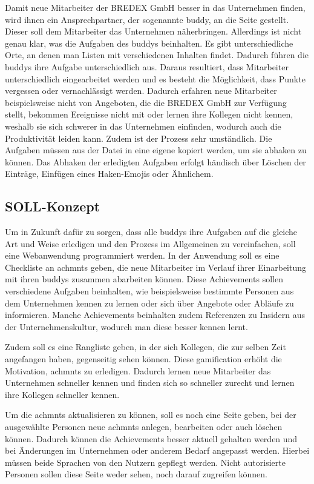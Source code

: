 \documentclass[11pt]{article}
\begin{document}
Damit neue Mitarbeiter der BREDEX GmbH besser in das Unternehmen
finden, wird ihnen ein Ansprechpartner, der sogenannte \gls{buddy},
an die Seite gestellt. Dieser soll dem Mitarbeiter das Unternehmen
näherbringen. Allerdings ist nicht genau klar, was die Aufgaben des \Glspl{buddy}
beinhalten. Es gibt unterschiedliche Orte, an denen man Listen mit
verschiedenen Inhalten findet. 
Dadurch führen die \Glspl{buddy} ihre Aufgabe unterschiedlich aus. Daraus resultiert, 
dass Mitarbeiter unterschiedlich eingearbeitet werden und es besteht die
Möglichkeit, dass Punkte vergessen oder vernachlässigt werden. Dadurch erfahren neue Mitarbeiter beispielsweise nicht
von Angeboten, die die BREDEX GmbH zur Verfügung stellt, bekommen Ereignisse nicht mit oder lernen ihre Kollegen nicht kennen,
weshalb sie sich schwerer in das Unternehmen einfinden, wodurch auch die Produktivität leiden kann. \newline %
Zudem ist der Prozess sehr umständlich. Die Aufgaben müssen aus der Datei in eine eigene kopiert werden,
um sie abhaken zu können. Das Abhaken der erledigten Aufgaben erfolgt händisch über Löschen der Einträge, 
Einfügen eines Haken-Emojis oder Ähnlichem. 


\subsection{SOLL-Konzept}

Um in Zukunft dafür zu sorgen, dass alle \Glspl{buddy} ihre Aufgaben auf die gleiche Art
und Weise erledigen und den Prozess im Allgemeinen zu vereinfachen, soll eine Webanwendung programmiert werden. 
In der Anwendung soll es eine Checkliste an \glspl{achmnt} geben, die neue Mitarbeiter im Verlauf ihrer Einarbeitung
mit ihren \Glspl{buddy} zusammen abarbeiten können. Diese Achievements sollen verschiedene Aufgaben beinhalten, wie beispielsweise bestimmte
Personen aus dem Unternehmen kennen zu lernen oder sich über Angebote oder Abläufe zu informieren. Manche Achievements beinhalten zudem
Referenzen zu Insidern aus der Unternehmenskultur, wodurch man diese besser kennen lernt.

Zudem soll es eine Rangliste geben, in der sich Kollegen, die zur selben Zeit angefangen haben, gegenseitig
sehen können. Diese \Gls{gamification} erhöht die Motivation, \glspl{achmnt} zu erledigen. Dadurch lernen neue Mitarbeiter
das Unternehmen schneller kennen und finden sich so schneller zurecht und lernen ihre Kollegen schneller kennen. 

Um die \glspl{achmnt} aktualisieren zu können, soll es noch eine Seite geben, bei der ausgewählte
Personen neue \glspl{achmnt} anlegen, bearbeiten oder auch löschen können. Dadurch können die Achievements besser aktuell gehalten werden und bei
Änderungen im Unternehmen oder anderem Bedarf angepasst werden. Hierbei müssen beide Sprachen von den Nutzern gepflegt werden.
Nicht autorisierte Personen sollen diese Seite weder sehen, noch darauf zugreifen können.
\end{document}
